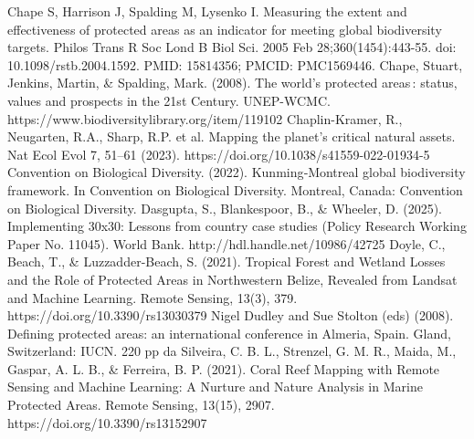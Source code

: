 \documentclass[12pt]{article}
\theoremstyle{break} %
\begin{document}
\newline \newline
Chape S, Harrison J, Spalding M, Lysenko I. Measuring the extent and effectiveness of protected areas as an indicator for meeting global biodiversity targets. Philos Trans R Soc Lond B Biol Sci. 2005 Feb 28;360(1454):443-55. doi: 10.1098/rstb.2004.1592. PMID: 15814356; PMCID: PMC1569446.
\newline \newline
Chape, Stuart, Jenkins, Martin, \& Spalding, Mark. (2008). The world’s protected areas : status, values and prospects in the 21st Century. UNEP-WCMC. https://www.biodiversitylibrary.org/item/119102
\newline \newline
Chaplin-Kramer, R., Neugarten, R.A., Sharp, R.P. et al. Mapping the planet’s critical natural assets. Nat Ecol Evol 7, 51–61 (2023). https://doi.org/10.1038/s41559-022-01934-5
\newline \newline
Convention on Biological Diversity. (2022). Kunming‐Montreal global biodiversity framework. In Convention on Biological Diversity. Montreal, Canada: Convention on Biological Diversity.
\newline \newline
Dasgupta, S., Blankespoor, B., \& Wheeler, D. (2025). Implementing 30x30: Lessons from country case studies (Policy Research Working Paper No. 11045). World Bank. http://hdl.handle.net/10986/42725
\newline \newline
Doyle, C., Beach, T., \& Luzzadder-Beach, S. (2021). Tropical Forest and Wetland Losses and the Role of Protected Areas in Northwestern Belize, Revealed from Landsat and Machine Learning. Remote Sensing, 13(3), 379. https://doi.org/10.3390/rs13030379
\newline \newline
Nigel Dudley and Sue Stolton (eds) (2008). Defining protected areas: an international conference in Almeria, Spain. Gland, Switzerland: IUCN. 220 pp 
\newline \newline
da Silveira, C. B. L., Strenzel, G. M. R., Maida, M., Gaspar, A. L. B., \& Ferreira, B. P. (2021). Coral Reef Mapping with Remote Sensing and Machine Learning: A Nurture and Nature Analysis in Marine Protected Areas. Remote Sensing, 13(15), 2907. https://doi.org/10.3390/rs13152907
\newline \newline
\end{document}
